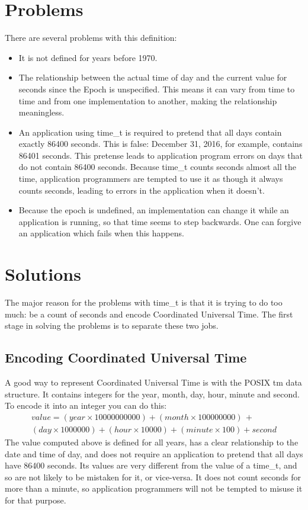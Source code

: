 \documentclass[letterpaper,twoside]{article}
\begin{document}
\section{Problems}
There are several problems with this definition:
\begin{itemize}
\item{It is not defined for years before 1970.}
\item{The relationship between the actual time of day and the current value
  for seconds since the Epoch is unspecified.
  This means it can vary from time to time
  and from one implementation to another, making the
  relationship meaningless.}
\item{An application using {\ttfamily time\_t} is required to pretend that
  all days
  contain exactly \num{86400} seconds.  This is false: December 31, 2016, for
  example, contains \num{86401} seconds.  This pretense leads to application
  program errors on days that do not contain \num{86400} seconds.
  Because {\ttfamily time\_t} counts seconds almost all the time,
  application programmers
  are tempted to use it as though it always counts seconds,
  leading to errors in the application when it doesn't.}
\item{Because the epoch is undefined, an implementation can change
  it while an application is running, so that time seems to step
  backwards.  One can forgive an application which fails when this
  happens.}
\end{itemize}

\section{Solutions}
The major reason for the problems with {\ttfamily time\_t} is that it is
trying to do
too much: be a count of seconds and encode Coordinated Universal Time.
The first stage in solving the problems is to separate these two jobs.

\subsection{Encoding Coordinated Universal Time}
A good way to represent Coordinated Universal Time is with the
POSIX {\ttfamily tm} data
structure.  It contains integers for the year, month, day, hour, minute
and second.  To encode it into an integer you can do this:
\begin{multline*}
  value = (year \times 10000000000) + (month \times 100000000) \,+ \\
  (day \times 1000000) + (hour \times 10000) + (minute \times 100) + second
\end{multline*}
The value computed above is defined for all years, has a clear relationship
to the date and time of day, and does not require an application to pretend
that all days have \num{86400} seconds.  Its values are very different from
the value of a {\ttfamily time\_t}, and so are not likely to be mistaken for it,
or vice-versa.  It does not count seconds for more than a minute, so
application programmers will not be tempted to misuse it for that purpose.
\end{document}
